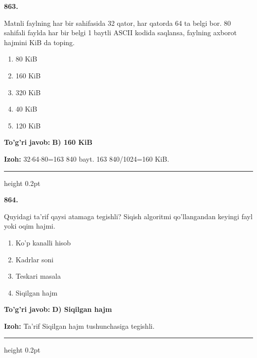 \documentclass[10pt,a4paper,oneside]{article}
\begin{document}
\noindent\textbf{\color{ink}863.}
\par
Matnli faylning har bir sahifasida 32 qator, har qatorda 64 ta belgi bor. 80 sahifali faylda har bir belgi 1 baytli ASCII kodida saqlansa, faylning axborot hajmini KiB da toping.
\begin{enumerate}[label=\Alph*),leftmargin=9mm]
\item 80 KiB
\item 160 KiB
\item 320 KiB
\item 40 KiB
\item 120 KiB
\end{enumerate}
\begin{tcolorbox}[enhanced,breakable,colback=teal!4,colframe=teal!50!black,boxrule=0.5pt,arc=1.1mm,left=3mm,right=3mm,top=1.7mm,bottom=1.7mm,before skip=2mm,after skip=2mm]
\textbf{\color{teal}To'g'ri javob:} \textbf{B) 160 KiB}
\par\smallskip
\textbf{Izoh:} 32\ensuremath{\cdot}64\ensuremath{\cdot}80=163 840 bayt. 163 840/1024=160 KiB.
\end{tcolorbox}
\vspace{2mm}\hrule height 0.2pt \vspace{3mm}

\noindent\textbf{\color{ink}864.}
\par
Quyidagi ta'rif qaysi atamaga tegishli? Siqish algoritmi qo'llangandan keyingi fayl yoki oqim hajmi.
\begin{enumerate}[label=\Alph*),leftmargin=9mm]
\item Ko'p kanalli hisob
\item Kadrlar soni
\item Teskari masala
\item Siqilgan hajm
\end{enumerate}
\begin{tcolorbox}[enhanced,breakable,colback=teal!4,colframe=teal!50!black,boxrule=0.5pt,arc=1.1mm,left=3mm,right=3mm,top=1.7mm,bottom=1.7mm,before skip=2mm,after skip=2mm]
\textbf{\color{teal}To'g'ri javob:} \textbf{D) Siqilgan hajm}
\par\smallskip
\textbf{Izoh:} Ta'rif Siqilgan hajm tushunchasiga tegishli.
\end{tcolorbox}
\vspace{2mm}\hrule height 0.2pt \vspace{3mm}
\end{document}

